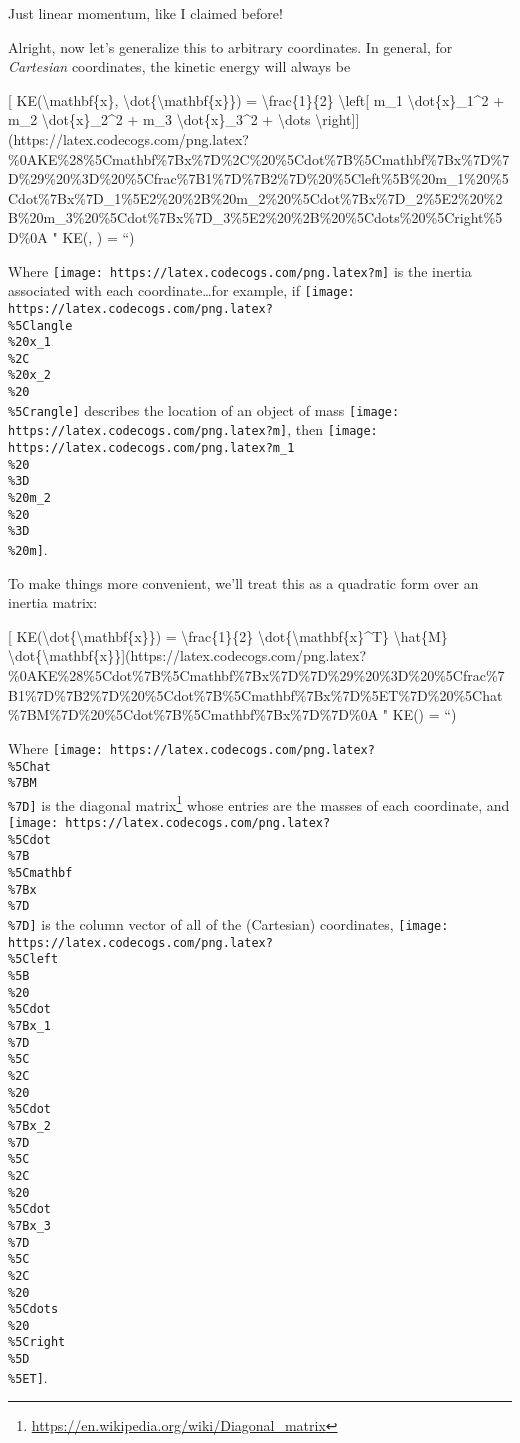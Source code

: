 \documentclass[]{article}
\renewcommand{\href}[2]{#2\footnote{\url{#1}}}
\begin{document}
Just linear momentum, like I claimed before!

Alright, now let's generalize this to arbitrary coordinates. In general, for
\emph{Cartesian} coordinates, the kinetic energy will always be

{[} KE(\textbackslash{}mathbf\{x\},
\textbackslash{}dot\{\textbackslash{}mathbf\{x\}\}) =
\textbackslash{}frac\{1\}\{2\} \textbackslash{}left{[} m\_1
\textbackslash{}dot\{x\}\_1\^{}2 + m\_2 \textbackslash{}dot\{x\}\_2\^{}2 + m\_3
\textbackslash{}dot\{x\}\_3\^{}2 + \textbackslash{}dots
\textbackslash{}right{]}{]}(https://latex.codecogs.com/png.latex?\%0AKE\%28\%5Cmathbf\%7Bx\%7D\%2C\%20\%5Cdot\%7B\%5Cmathbf\%7Bx\%7D\%7D\%29\%20\%3D\%20\%5Cfrac\%7B1\%7D\%7B2\%7D\%20\%5Cleft\%5B\%20m\_1\%20\%5Cdot\%7Bx\%7D\_1\%5E2\%20\%2B\%20m\_2\%20\%5Cdot\%7Bx\%7D\_2\%5E2\%20\%2B\%20m\_3\%20\%5Cdot\%7Bx\%7D\_3\%5E2\%20\%2B\%20\%5Cdots\%20\%5Cright\%5D\%0A
" KE(, ) = 
``)

Where \texttt{[image: https://latex.codecogs.com/png.latex?m]} is the inertia
associated with each coordinate\ldots{}for example, if
\texttt{[image: https://latex.codecogs.com/png.latex?\\\%5Clangle\\\%20x\_1\\\%2C\\\%20x\_2\\\%20\\\%5Crangle]}
describes the location of an object of mass
\texttt{[image: https://latex.codecogs.com/png.latex?m]}, then
\texttt{[image: https://latex.codecogs.com/png.latex?m\_1\\\%20\\\%3D\\\%20m\_2\\\%20\\\%3D\\\%20m]}.

To make things more convenient, we'll treat this as a quadratic form over an
inertia matrix:

{[} KE(\textbackslash{}dot\{\textbackslash{}mathbf\{x\}\}) =
\textbackslash{}frac\{1\}\{2\}
\textbackslash{}dot\{\textbackslash{}mathbf\{x\}\^{}T\} \textbackslash{}hat\{M\}
\textbackslash{}dot\{\textbackslash{}mathbf\{x\}\}{]}(https://latex.codecogs.com/png.latex?\%0AKE\%28\%5Cdot\%7B\%5Cmathbf\%7Bx\%7D\%7D\%29\%20\%3D\%20\%5Cfrac\%7B1\%7D\%7B2\%7D\%20\%5Cdot\%7B\%5Cmathbf\%7Bx\%7D\%5ET\%7D\%20\%5Chat\%7BM\%7D\%20\%5Cdot\%7B\%5Cmathbf\%7Bx\%7D\%7D\%0A
" KE() =    
``)

Where \texttt{[image: https://latex.codecogs.com/png.latex?\\\%5Chat\\\%7BM\\\%7D]} is
the \href{https://en.wikipedia.org/wiki/Diagonal_matrix}{diagonal matrix} whose
entries are the masses of each coordinate, and
\texttt{[image: https://latex.codecogs.com/png.latex?\\\%5Cdot\\\%7B\\\%5Cmathbf\\\%7Bx\\\%7D\\\%7D]}
is the column vector of all of the (Cartesian) coordinates,
\texttt{[image: https://latex.codecogs.com/png.latex?\\\%5Cleft\\\%5B\\\%20\\\%5Cdot\\\%7Bx\_1\\\%7D\\\%5C\\\%2C\\\%20\\\%5Cdot\\\%7Bx\_2\\\%7D\\\%5C\\\%2C\\\%20\\\%5Cdot\\\%7Bx\_3\\\%7D\\\%5C\\\%2C\\\%20\\\%5Cdots\\\%20\\\%5Cright\\\%5D\\\%5ET]}.
\end{document}
